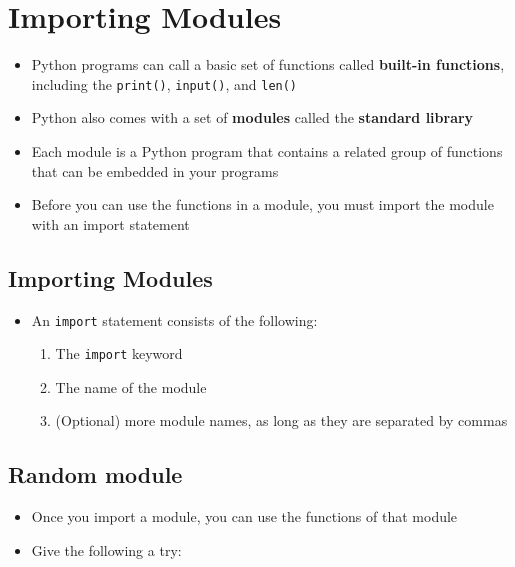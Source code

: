 \documentclass[11pt]{article}
\providecommand{\tightlist}{%
      \setlength{\itemsep}{0pt}\setlength{\parskip}{0pt}}
\begin{document}
    \hypertarget{importing-modules}{%
\section{Importing Modules}\label{importing-modules}}

\begin{itemize}
\tightlist
\item
  Python programs can call a basic set of functions called
  \textbf{built-in functions}, including the \texttt{print()},
  \texttt{input()}, and \texttt{len()}
\item
  Python also comes with a set of \textbf{modules} called the
  \textbf{standard library}
\item
  Each module is a Python program that contains a related group of
  functions that can be embedded in your programs
\item
  Before you can use the functions in a module, you must import the
  module with an import statement
\end{itemize}

    \hypertarget{importing-modules}{%
\subsection{Importing Modules}\label{importing-modules}}

\begin{itemize}
\tightlist
\item
  An \texttt{import} statement consists of the following:

  \begin{enumerate}
  \def\labelenumi{\arabic{enumi}.}
  \tightlist
  \item
    The \texttt{import} keyword
  \item
    The name of the module
  \item
    (Optional) more module names, as long as they are separated by
    commas
  \end{enumerate}
\end{itemize}

    \hypertarget{random-module}{%
\subsection{Random module}\label{random-module}}

\begin{itemize}
\tightlist
\item
  Once you import a module, you can use the functions of that module
\item
  Give the following a try:
\end{itemize}
\end{document}
